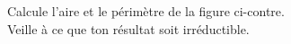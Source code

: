 %
%
Calcule l'aire et le périmètre de la figure ci-contre. \\
  Veille à ce que ton résultat soit irréductible.
